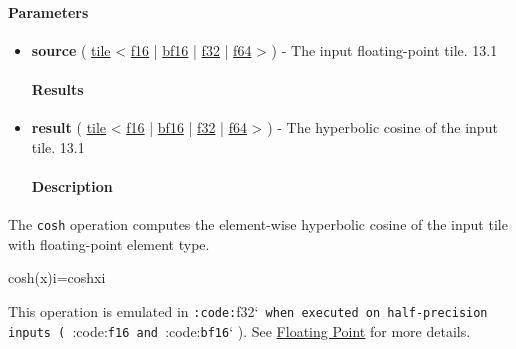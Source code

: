 \documentclass{article}
\begin{document}
\paragraph{Parameters}

\begin{itemize}
\item \textbf{source} ( \href{https://docs.nvidia.com/cuda/tile-ir/latest/sections/types.html#type-tile}{tile} < \href{https://docs.nvidia.com/cuda/tile-ir/latest/sections/types.html#subsection-element-types}{f16} | \href{https://docs.nvidia.com/cuda/tile-ir/latest/sections/types.html#subsection-element-types}{bf16} | \href{https://docs.nvidia.com/cuda/tile-ir/latest/sections/types.html#subsection-element-types}{f32} | \href{https://docs.nvidia.com/cuda/tile-ir/latest/sections/types.html#subsection-element-types}{f64} > ) - The input floating-point tile. 13.1


\paragraph{Results}

\item \textbf{result} ( \href{https://docs.nvidia.com/cuda/tile-ir/latest/sections/types.html#type-tile}{tile} < \href{https://docs.nvidia.com/cuda/tile-ir/latest/sections/types.html#subsection-element-types}{f16} | \href{https://docs.nvidia.com/cuda/tile-ir/latest/sections/types.html#subsection-element-types}{bf16} | \href{https://docs.nvidia.com/cuda/tile-ir/latest/sections/types.html#subsection-element-types}{f32} | \href{https://docs.nvidia.com/cuda/tile-ir/latest/sections/types.html#subsection-element-types}{f64} > ) - The hyperbolic cosine of the input tile. 13.1


\paragraph{Description}

\end{itemize}
The \texttt{cosh} operation computes the element-wise hyperbolic cosine of the input tile with floating-point element type.


cosh(x)i=coshxi

This operation is emulated in \texttt{:code:}f32`\texttt{ when executed on half-precision inputs ( }:code:\texttt{f16}\texttt{ and }:code:\texttt{bf16}` ). See \href{https://docs.nvidia.com/cuda/tile-ir/latest/sections/operations.html#op-group-floating-point}{Floating Point} for more details.
\end{document}
